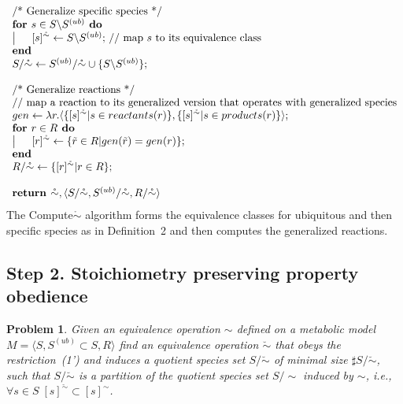 \documentclass[9pt]{article}
\newcounter{pbm}
\newcounter{def}
\newcounter{rm}
\begin{document}
\[\begin{array}{l}
\mbox{~}\\
\mbox{/* Generalize specific species */}\\
\mbox{\textbf{for }$s \in S \backslash S^{(ub)}$\textbf{ do}}\\
\left| \indent\mbox{$[s]^{\mathring{\sim}}   \leftarrow S \backslash S^{(ub)};$ // map $s$ to its equivalence class}\right. \\
\mbox{\textbf{end}}\\
\mbox{$S/{\mathring{\sim}} \leftarrow {S^{(ub)}/{\mathring{\sim}}}\cup\{S \backslash S^{(ub)}\};$}\\
\mbox{~}\\
\mbox{/* Generalize reactions */}\\
\mbox{// map a reaction to its generalized version that operates with generalized species}\\
\mbox{$gen \leftarrow \lambda{r}.\langle\{[s]^{\mathring{\sim}} | s \in reactants(r)\}, \{[s]^{\mathring{\sim}} | s \in products(r)\}\rangle;$}\\
\mbox{\textbf{for }$r \in R$\textbf{ do}}\\
\left| \indent\mbox{$[r]^{\mathring{\sim}} \leftarrow \{\tilde{r} \in R|gen(\tilde{r})=gen(r)\};$}\right. \\
\mbox{\textbf{end}}\\
\mbox{$R/{\mathring{\sim}} \leftarrow \{[r]^{\mathring{\sim}}|r \in R\};$}\\
\mbox{~}\\
\mbox{\textbf{return }$\mathring{\sim}, \langle S/{\mathring{\sim}}, S^{(ub)}/{\mathring{\sim}}, R/{\mathring{\sim}} \rangle$}
\end{array} \]
The Compute$\mathring{\sim}$ algorithm forms the equivalence classes for ubiquitous and then specific species as in Definition~2 and then computes the generalized reactions.

\subsection*{Step 2. Stoichiometry preserving property obedience}
\newtheorem{p2}[pbm]{Problem}
\begin{p2}
Given an equivalence operation $\sim$ defined on a metabolic model $M=\langle S, S^{(ub)}\subset{S}, R \rangle$ find an equivalence operation $\breve{\sim}$ that obeys the restriction~(1') and induces a quotient species set $S/\breve{\sim}$ of minimal size $\sharp S/\breve{\sim}$, such that $S/\breve{\sim}$ is a partition of the quotient species set $S/{\sim}$ induced by $\sim$, i.e., $\forall s \in S \; [s]^{\breve{\sim}} \subset [s]^{\sim} $. 
\end{p2}
\end{document}
